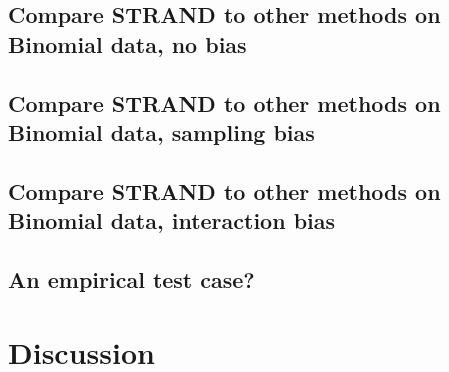 \documentclass[Afour,sageh,times]{sagej}
\begin{document}
\subsection{Compare STRAND to other methods on Binomial data, no bias}

\subsection{Compare STRAND to other methods on Binomial data, sampling bias}

\subsection{Compare STRAND to other methods on Binomial data, interaction bias}

\subsection{An empirical test case?}

\section{Discussion}







\end{document}
